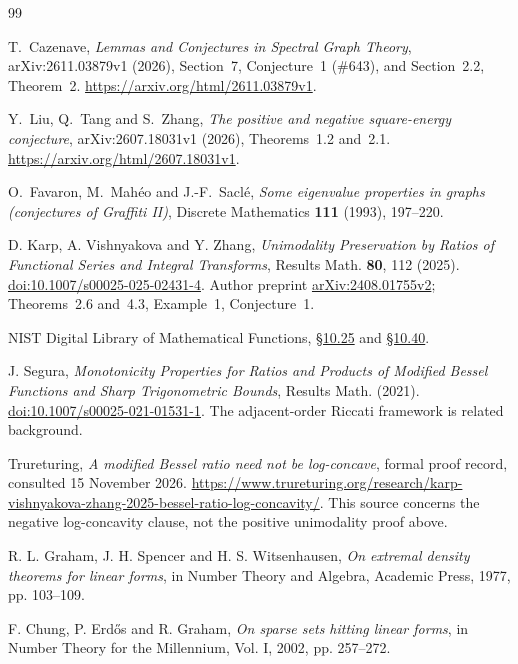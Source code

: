\documentclass[11pt,a4paper]{article}
\theoremstyle{remark}\newtheorem{remark}[theorem]{Remark}
\numberwithin{equation}{section}
\begin{document}
\begin{thebibliography}{99}\small\raggedright
{}
T.~Cazenave,
\emph{Lemmas and Conjectures in Spectral Graph Theory},
arXiv:2611.03879v1 (2026), Section~7, Conjecture~1 (\#643),
and Section~2.2, Theorem~2.
\url{https://arxiv.org/html/2611.03879v1}.

Y.~Liu, Q.~Tang and S.~Zhang,
\emph{The positive and negative square-energy conjecture},
arXiv:2607.18031v1 (2026), Theorems~1.2 and~2.1.
\url{https://arxiv.org/html/2607.18031v1}.

O.~Favaron, M.~Mah\'eo and J.-F.~Sacl\'e,
\emph{Some eigenvalue properties in graphs (conjectures of Graffiti II)},
Discrete Mathematics \textbf{111} (1993), 197--220.

D. Karp, A. Vishnyakova and Y. Zhang,
\emph{Unimodality Preservation by Ratios of Functional Series and
Integral Transforms}, Results Math. \textbf{80}, 112 (2025).
\href{https://doi.org/10.1007/s00025-025-02431-4}{doi:10.1007/s00025-025-02431-4}.
Author preprint \href{https://arxiv.org/html/2408.01755v2}{arXiv:2408.01755v2};
Theorems~2.6 and~4.3, Example~1, Conjecture~1.

NIST Digital Library of Mathematical Functions,
\href{https://dlmf.nist.gov/10.25}{\S10.25} and
\href{https://dlmf.nist.gov/10.40}{\S10.40}.

J. Segura, \emph{Monotonicity Properties for Ratios and Products of
Modified Bessel Functions and Sharp Trigonometric Bounds},
Results Math. (2021).
\href{https://doi.org/10.1007/s00025-021-01531-1}{doi:10.1007/s00025-021-01531-1}.
The adjacent-order Riccati framework is related background.

Trureturing, \emph{A modified Bessel ratio need not be log-concave},
formal proof record, consulted 15 November 2026.
\url{https://www.trureturing.org/research/karp-vishnyakova-zhang-2025-bessel-ratio-log-concavity/}.
This source concerns the negative log-concavity clause, not the
positive unimodality proof above.

R. L. Graham, J. H. Spencer and H. S. Witsenhausen,
\emph{On extremal density theorems for linear forms}, in
Number Theory and Algebra, Academic Press, 1977, pp. 103--109.

F. Chung, P. Erd\H{o}s and R. Graham,
\emph{On sparse sets hitting linear forms}, in
Number Theory for the Millennium, Vol. I, 2002, pp. 257--272.


\end{thebibliography}
\end{document}
